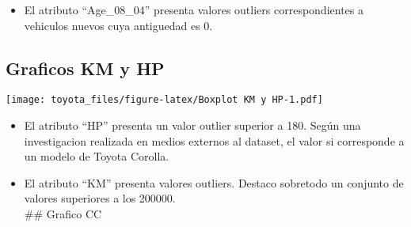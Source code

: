 \documentclass[]{article}
\newenvironment{Shaded}{\begin{snugshade}}{\end{snugshade}}
\newcommand{\DataTypeTok}[1]{\textcolor[rgb]{0.13,0.29,0.53}{#1}}
\newcommand{\DecValTok}[1]{\textcolor[rgb]{0.00,0.00,0.81}{#1}}
\newcommand{\KeywordTok}[1]{\textcolor[rgb]{0.13,0.29,0.53}{\textbf{#1}}}
\newcommand{\NormalTok}[1]{#1}
\newcommand{\OperatorTok}[1]{\textcolor[rgb]{0.81,0.36,0.00}{\textbf{#1}}}
\newcommand{\OtherTok}[1]{\textcolor[rgb]{0.56,0.35,0.01}{#1}}
\newcommand{\StringTok}[1]{\textcolor[rgb]{0.31,0.60,0.02}{#1}}
\providecommand{\tightlist}{%
  \setlength{\itemsep}{0pt}\setlength{\parskip}{0pt}}
\begin{document}
\begin{itemize}
\tightlist
\item
  El atributo ``Age\_08\_04'' presenta valores outliers correspondientes
  a vehiculos nuevos cuya antiguedad es 0.
\end{itemize}

\hypertarget{graficos-km-y-hp}{%
\subsection{Graficos KM y HP}\label{graficos-km-y-hp}}

\begin{Shaded}
\end{Shaded}

\texttt{[image: toyota\_files/figure-latex/Boxplot KM y HP-1.pdf]}

\begin{itemize}
\item
  El atributo ``HP'' presenta un valor outlier superior a 180. Según una
  investigacion realizada en medios externos al dataset, el valor si
  corresponde a un modelo de Toyota Corolla.
\item
  El atributo ``KM'' presenta valores outliers. Destaco sobretodo un
  conjunto de valores superiores a los 200000.\\
  \#\# Grafico CC
\end{itemize}

\begin{Shaded}
\end{Shaded}
\end{document}
